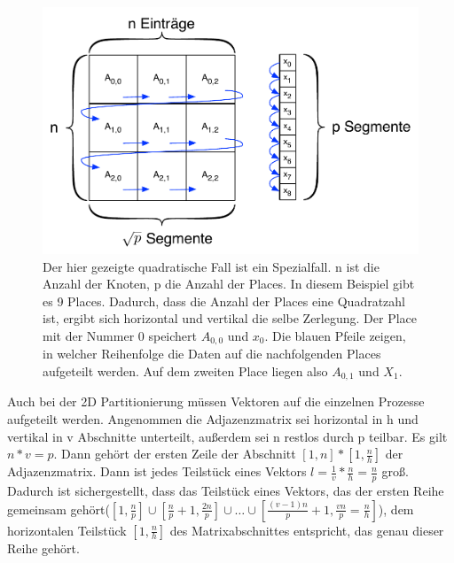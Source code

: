 \begin{figure}[ht]
\centering
	\label{img:2d-decomposition}
	\includegraphics{pics/2d-decomposition.pdf}
	\caption{Der hier gezeigte quadratische Fall ist ein Spezialfall. n ist die Anzahl der Knoten, p die Anzahl der Places. In diesem Beispiel gibt es 9 Places. Dadurch, dass die Anzahl der Places eine Quadratzahl ist, ergibt sich horizontal und vertikal die selbe Zerlegung. Der Place mit der Nummer 0 speichert $A_{0,0}$ und $x_0$. Die blauen Pfeile zeigen, in welcher Reihenfolge die Daten auf die nachfolgenden Places aufgeteilt werden. Auf dem zweiten Place liegen also $A_{0,1}$ und $X_1$.}
\end{figure}

Auch bei der 2D Partitionierung müssen Vektoren auf die einzelnen Prozesse aufgeteilt werden. Angenommen die Adjazenzmatrix sei horizontal in h und vertikal in v Abschnitte unterteilt, außerdem sei n restlos durch p teilbar. Es gilt $n*v=p$. Dann gehört der ersten Zeile der Abschnitt $ \left[1,n\right] * \left[1,\frac{n}{h}\right]$ der Adjazenzmatrix. Dann ist jedes Teilstück eines Vektors $l = \frac{1}{v} * \frac{n}{h} = \frac{n}{p}$ groß. Dadurch ist sichergestellt, dass das Teilstück eines Vektors, das der ersten Reihe gemeinsam gehört($\left[1,\frac{n}{p}\right] \cup \left[\frac{n}{p}+1,\frac{2n}{p}\right] \cup \dots \cup \left[\frac{(v-1)n}{p}+1,\frac{vn}{p}=\frac{n}{h}\right] $), dem horizontalen Teilstück $\left[1,\frac{n}{h}\right]$ des Matrixabschnittes entspricht, das genau dieser Reihe gehört.


